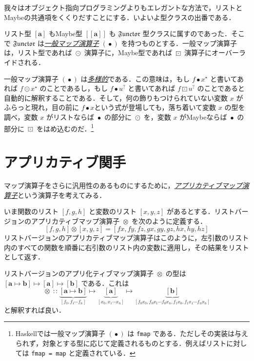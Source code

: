 \documentclass[a4paper]{jsbook}
\def\[{\left[\!\left[}
\def\]{\right]\!\right]}
\newcommand{\programminglanguage}[1]{\textsf{#1}}
\newcommand{\haskell}{\programminglanguage{Haskell}}
\newcommand{\keyword}[1]{{\underline{\emph{#1}}}}
\newcommand{\code}[1]{\texttt{#1}}
\newcommand{\mListWith}[1]{\left[#1\right]}
\newcommand{\mMaybeWith}[1]{\[#1\]}
\newcommand{\mType}[1]{\mathbf{#1}}
\newcommand{\mListType}[1]{\mListWith{\mType{#1}}}
\newcommand{\mMaybeType}[1]{\mMaybeWith{\mType{#1}}}
\newcommand{\mSpecialTypeClass}[1]{\mathfrak{#1}} %
\newcommand{\mFunctorTypeClass}{\mSpecialTypeClass{Functor}}
\newcommand{\mList}[1]{{#1}^\mathrm{\star}}
\newcommand{\mMaybe}[1]{{#1}^\text{?}}
\DeclareMathOperator{\mIn}{{:\!:}}
\DeclareMathOperator{\mMapsTo}{\mapsto}
\DeclareMathOperator{\mMap}{\bullet}
\DeclareMathOperator{\mMapList}{\odot}
\DeclareMathOperator{\mMapMaybe}{\boxdot}
\DeclareMathOperator{\mAppMapList}{\otimes}
\newcommand{\mProj}[2]{#1\mMapsTo#2}
\begin{document}
我々はオブジェクト指向プログラミングよりもエレガントな方法で，リストとMaybeの共通項をくくりだすことにする．いよいよ型クラスの出番である．

リスト型 $\mListType{a}$ もMaybe型 $\mMaybeType{a}$ も $\mFunctorTypeClass$ 型クラスに属すのであった．そこで $\mFunctorTypeClass$ は\keyword{一般マップ演算子} $(\mMap)$ を持つものとする．一般マップ演算子は，リスト型であれば $\mMapList$ 演算子に，Maybe型であれば $\mMapMaybe$ 演算子にオーバーライドされる．

一般マップ演算子 $(\mMap)$ は\keyword{多様的}である．この意味は，もし $f\mMap\mList{x}$ と書いてあれば $f\mMapList\mList{x}$ のことであるし，もし $f\mMap\mMaybe{u}$ と書いてあれば $f\mMapMaybe\mMaybe{u}$ のことであると自動的に解釈することである．そして，何の飾りもつけられていない変数 $x$ がふらっと現れ，目の前に $f\mMap x$という式が登場しても，落ち着いて変数 $x$ の型を調べ，変数 $x$ がリストならば $\mMap$ の部分に $\mMapList$ を，変数 $x$ がMaybeならば $\mMap$ の部分に $\mMapMaybe$ をはめ込むのだ．\footnote{\haskell では一般マップ演算子 $(\mMap)$ は \code{fmap} である．ただしその実装は与えられず，対象とする型に応じて定義されるものとする．例えばリストに対しては \code{fmap = map} と定義されている．}


\section{アプリカティブ関手}

マップ演算子をさらに汎用性のあるものにするために，\keyword{アプリカティブマップ演算子}という演算子を考えてみる．

いま関数のリスト $\mListWith{f,g,h}$ と変数のリスト $\mListWith{x,y,z}$ があるとする．リストバージョンのアプリカティブマップ演算子 $\mAppMapList$ を次のように定義する．
\begin{equation}
\mListWith{f,g,h}\mAppMapList\mListWith{x,y,z}
=\mListWith{fx,fy,fz,gx,gy,gz,hx,hy,hz}
\end{equation}
リストバージョンのアプリカティブマップ演算子はこのように，左引数のリスト内のすべての関数を順番に右引数のリスト内の変数に適用し，その結果をリストとして返す．

リストバージョンのアプリ化ティブマップ演算子 $\mAppMapList$ の型は $\mProj{\mListType{\mProj{\mType{a}}{\mType{b}}}}{\mProj{\mListType{\mType{a}}}{\mListType{\mType{b}}}}$ である．これは
\begin{equation}
\mAppMapList\mIn
\underbrace{\mListWith{\mType{a}\mapsto\mType{b}}}_{\mListWith{f_0,f_1\dotsb f_n}}
\mapsto
\underbrace{\mListType{a}}_{\mListWith{x_0,x_1\dotsb x_n}}
\mapsto
\underbrace{\mListType{\mType{b}}}_{\mListWith{f_0x_0,f_0x_1\dotsb f_0x_n,f_1x_0,f_1x_1\dotsb f_nx_n}}
\end{equation}
と解釈すれば良い．
\end{document}

